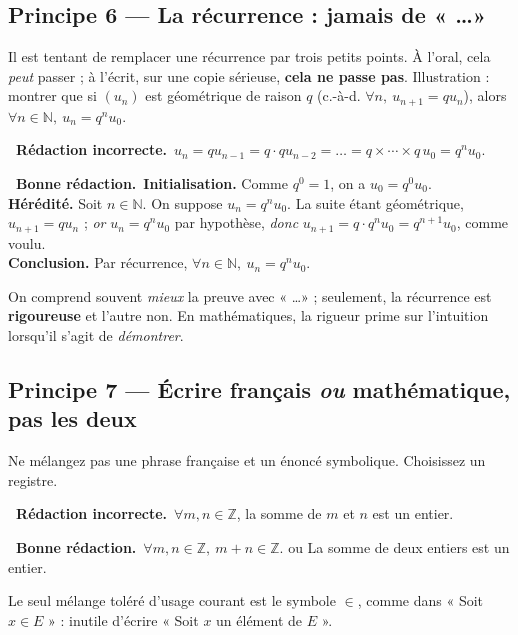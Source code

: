 \documentclass[11pt,a4paper]{article}
\newcommand{\ok}{\textcolor{METeal}{\textbf{\ding{51}\ \sffamily Bonne rédaction.}}\ }
\newcommand{\ko}{\textcolor{MECoral}{\textbf{\ding{55}\ \sffamily Rédaction incorrecte.}}\ }
\newcommand{\N}{\mathbb{N}}
\newcommand{\Z}{\mathbb{Z}}
\begin{document}
\subsection{Principe 6 — La récurrence : jamais de « \dots »}

Il est tentant de remplacer une récurrence par trois petits points. À l'oral, cela \emph{peut}
passer ; à l'écrit, sur une copie sérieuse, \textbf{cela ne passe pas}. Illustration : montrer
que si $(u_n)$ est géométrique de raison $q$ (c.-à-d. $\forall n,\ u_{n+1}=qu_n$), alors
$\forall n\in\N,\ u_n=q^n u_0$.
\begin{mauvaise}
\ko $u_n=qu_{n-1}=q\cdot qu_{n-2}=\dots=q\times\cdots\times q\,u_0=q^n u_0.$
\end{mauvaise}
\begin{bonne}
\ok \textbf{Initialisation.} Comme $q^0=1$, on a $u_0=q^0u_0$.\\
\textbf{Hérédité.} Soit $n\in\N$. On suppose $u_n=q^n u_0$. La suite étant géométrique,
$u_{n+1}=qu_n$ ; \emph{or} $u_n=q^nu_0$ par hypothèse, \emph{donc}
$u_{n+1}=q\cdot q^nu_0=q^{n+1}u_0$, comme voulu.\\
\textbf{Conclusion.} Par récurrence, $\forall n\in\N,\ u_n=q^nu_0$.
\end{bonne}

\begin{remarque}
On comprend souvent \emph{mieux} la preuve avec « \dots » ; seulement, la récurrence est
\textbf{rigoureuse} et l'autre non. En mathématiques, la rigueur prime sur l'intuition
lorsqu'il s'agit de \emph{démontrer}.
\end{remarque}

\subsection{Principe 7 — Écrire français \emph{ou} mathématique, pas les deux}

\begin{attention}
Ne mélangez pas une phrase française et un énoncé symbolique. Choisissez un registre.
\end{attention}
\begin{mauvaise}
\ko $\forall m,n\in\Z$, la somme de $m$ et $n$ est un entier.
\end{mauvaise}
\begin{bonne}
\ok $\forall m,n\in\Z,\ m+n\in\Z.$ \qquad ou \qquad La somme de deux entiers est un entier.
\end{bonne}
Le seul mélange toléré d'usage courant est le symbole $\in$, comme dans « Soit $x\in E$ » :
inutile d'écrire « Soit $x$ un élément de $E$ ».
\end{document}
